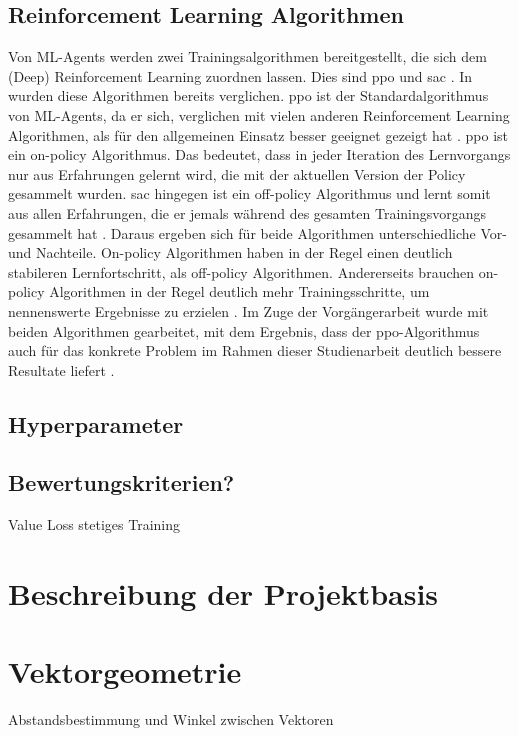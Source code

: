 \subsection{Reinforcement Learning Algorithmen}
Von ML-Agents werden zwei Trainingsalgorithmen bereitgestellt, die sich dem (Deep) Reinforcement Learning zuordnen lassen.
Dies sind \acf{ppo} und \acf{sac} \cite{mlagentsOverview}.
In \cite{waidner.2020} wurden diese Algorithmen bereits verglichen.
\ac{ppo} ist der Standardalgorithmus von ML-Agents, da er sich, verglichen mit vielen anderen Reinforcement Learning Algorithmen, als für den allgemeinen Einsatz besser geeignet gezeigt hat \cite{schulman2017proximal,openaiPPO}.
\ac{ppo} ist ein on-policy Algorithmus.
Das bedeutet, dass in jeder Iteration des Lernvorgangs nur aus Erfahrungen gelernt wird, die mit der aktuellen Version der Policy gesammelt wurden.
\ac{sac} hingegen ist ein off-policy Algorithmus und lernt somit aus allen Erfahrungen, die er jemals während des gesamten Trainingsvorgangs gesammelt hat \cite{suran2020,sagar2020}.
Daraus ergeben sich für beide Algorithmen unterschiedliche Vor- und Nachteile.
On-policy Algorithmen haben in der Regel einen deutlich stabileren Lernfortschritt, als off-policy Algorithmen.
Andererseits brauchen on-policy Algorithmen in der Regel deutlich mehr Trainingsschritte, um nennenswerte Ergebnisse zu erzielen \cite{mlagentsOverview}.
Im Zuge der Vorgängerarbeit wurde mit beiden Algorithmen gearbeitet, mit dem Ergebnis, dass der \ac{ppo}-Algorithmus auch für das konkrete Problem im Rahmen dieser Studienarbeit deutlich bessere Resultate liefert \cite[48]{waidner.2020}.

\subsection{Hyperparameter}


\subsection{Bewertungskriterien?}
Value Loss
stetiges Training
\cite{aurelian2018,untiyMetrics}

\section{Beschreibung der Projektbasis}

\section{Vektorgeometrie}
Abstandsbestimmung und Winkel zwischen Vektoren